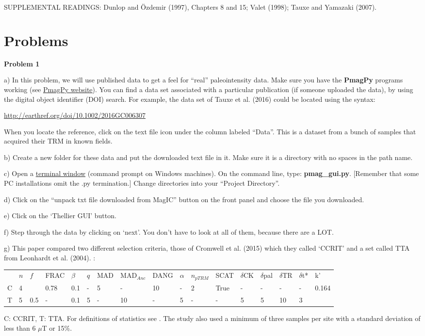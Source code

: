 \noindent SUPPLEMENTAL READINGS: Dunlop and \"Ozdemir (1997), Chapters 8 and 15; \nocite{dunlop97}
Valet (1998); \nocite{valet98}
Tauxe and Yamazaki (2007). \nocite{tauxe07}


\section{Problems}

{{\parindent 0pt  \parskip 12pt

{\bf Problem 1 }

a)  In this problem, we will use published data to get a feel for ``real'' paleointensity data.  Make sure you have the {\bf PmagPy} programs working (see \href{http://earthref.org/PmagPy}{PmagPy website}).  You can find a data set associated with a particular publication (if someone uploaded the data), by using the digital object identifier (DOI) search.  For example, the data set of Tauxe et al. (2016)  \nocite{tauxe16} could be located using the syntax:   

\url{http://earthref.org/doi/10.1002/2016GC006307} 	
	
When you locate the reference, click on the text file icon under the column labeled ``Data''.     This is a dataset  from a bunch of samples that acquired their TRM in known fields.   

b) Create a new folder for these data and put the downloaded text file in it.  Make sure it is a directory with no spaces in the path name.

c) Open a \href{http://earthref.org/PmagPy/#command_line}{terminal window} (command prompt on Windows machines).    On the command line,  type:  {\bf pmag\_gui.py}. [Remember that some PC installations omit the .py termination.]   Change directories into your ``Project Directory''. 

d) Click on the  ``unpack  txt file downloaded from MagIC''  button on the front panel and choose the file you downloaded. 

e) Click on the `Thellier GUI' button.  

f) Step through the data by clicking on `next'.  You don't have to look at all of them, because there are a LOT.  

g)  This paper compared two different selection criteria, those of Cromwell et al. (2015) \nocite{cromwell15} which they called `CCRIT' and a set called TTA from  Leonhardt et al. (2004). \cite{leonhardt04}:  


\begin{tabular}{lllllllllllllllll}
\hline
& $n$&   $f$&FRAC&$\beta$&$q$&MAD&MAD$_{Anc}$&DANG&$\alpha$& $n_{pTRM}$&SCAT&$\delta$CK&$\delta$pal&$\delta$TR&$\delta$t*&k'\\
C&4  & &0.78 & 0.1&-&5 & - &  10 & - &2& True & - & -& - &- &0.164\\
T&5   &0.5 & - & 0.1& 5&- & 10&- &5 & -& -& 5&5 & 10&3 &\\
\hline
\end{tabular}
C: CCRIT, T: TTA.  For definitions of statistics see \cite{paterson14}.  The study also used a minimum of three samples per site with a standard deviation of less than 6 $\mu$T or 15\%.   


}}
